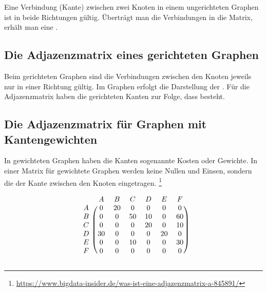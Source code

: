 \documentclass{lehramt-informatik}
\begin{document}
Eine Verbindung (Kante) zwischen zwei Knoten in einem ungerichteten
Graphen ist in beide Richtungen gültig. Überträgt man die Verbindungen
in die Matrix, erhält man eine .

%

\subsection{Die Adjazenzmatrix eines gerichteten Graphen}

Beim gerichteten Graphen sind die Verbindungen zwischen den Knoten
jeweils nur in einer Richtung gültig. Im Graphen erfolgt die Darstellung
der . Für die Adjazenzmatrix haben die
gerichteten Kanten zur Folge, dass  besteht.

%

\subsection{Die Adjazenzmatrix für Graphen mit Kantengewichten}

In gewichteten Graphen haben die Kanten sogenannte Kosten oder Gewichte.
In einer Matrix für gewichtete Graphen werden keine Nullen und Einsen,
sondern die  der Kante zwischen
den Knoten eingetragen.
\footnote{\url{https://www.bigdata-insider.de/was-ist-eine-adjazenzmatrix-a-845891/}}

\[
\begin{blockarray}{ccccccc}
& A & B & C & D & E & F \\
\begin{block}{c(cccccc)}
A & 0  & 20 & 0  & 0  & 0  & 0  \\
B & 0  & 0  & 50 & 10 & 0  & 60 \\
C & 0  & 0  & 0  & 20 & 0  & 10 \\
D & 30 & 0  & 0  & 0  & 20 & 0  \\
E & 0  & 0  & 10 & 0  & 0  & 30 \\
F & 0  & 0  & 0  & 0  & 0  & 0  \\
\end{block}
\end{blockarray}
\]

\usetikzlibrary{matrix,arrows,fit}

\end{document}

